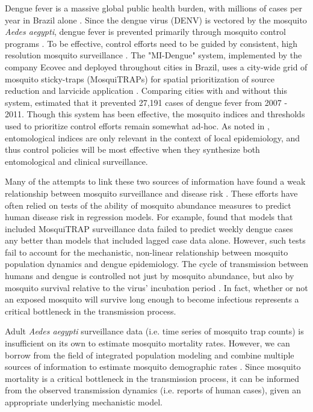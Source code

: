 \documentclass[10pt,letterpaper]{article}
\begin{document}
Dengue fever is a massive global public health burden, with millions of cases per year in Brazil alone \cite{Bhatt2013}.  
Since the dengue virus (DENV) is vectored by the mosquito \textit{Aedes aegypti}, dengue fever is prevented primarily through mosquito control programs \cite{Achee2015}.
To be effective, control efforts need to be guided by consistent, high resolution mosquito surveillance \cite{Morrison2008}.
The "MI-Dengue" system, implemented by the company Ecovec and deployed throughout cities in Brazil, uses a city-wide grid of mosquito sticky-traps (MosquiTRAPs) for spatial prioritization of source reduction and larvicide application \cite{Eiras2009}.
Comparing cities with and without this system, \cite{Pepin2013} estimated that it prevented 27,191 cases of dengue fever from 2007 - 2011.
Though this system has been effective, the mosquito indices and thresholds used to prioritize control efforts remain somewhat ad-hoc.
As noted in \cite{Morrison2008}, entomological indices are only relevant in the context of local epidemiology, and thus control policies will be most effective when they synthesize both entomological and clinical surveillance.

Many of the attempts to link these two sources of information have found a weak relationship between mosquito surveillance and disease risk \cite{Bowman2014, Cromwell2017}.
These efforts have often relied on tests of the ability of mosquito abundance measures to predict human disease risk in regression models.
For example, \cite{Pepin2015} found that models that included MosquiTRAP surveillance data failed to predict weekly dengue cases any better than models that included lagged case data alone.
However, such tests fail to account for the mechanistic, non-linear relationship between mosquito population dynamics and dengue epidemiology.
The cycle of transmission between humans and dengue is controlled not just by mosquito abundance, but also by mosquito survival relative to the virus' incubation period \cite{Achee2015}.
In fact, whether or not an exposed mosquito will survive long enough to become infectious represents a critical bottleneck in the transmission process.

Adult \textit{Aedes aegypti} surveillance data (i.e. time series of mosquito trap counts) is insufficient on its own to estimate mosquito mortality rates.
However, we can borrow from the field of integrated population modeling and combine multiple sources of information to estimate mosquito demographic rates \cite{Schaub2010}.
Since mosquito mortality is a critical bottleneck in the transmission process, it can be informed from the observed transmission dynamics (i.e. reports of human cases), given an appropriate underlying mechanistic model.
\end{document}
